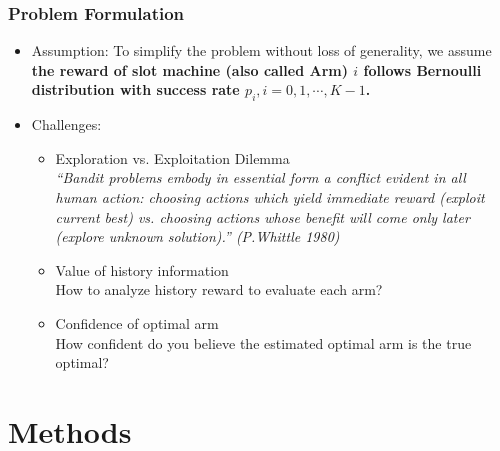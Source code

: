 \documentclass[compress]{beamer}
\begin{document}
\begin{frame}
\frametitle{Problem Formulation}
\begin{itemize}
  \item Assumption: To simplify the problem without loss of generality, we assume \textbf{the reward of slot machine (also called Arm) $i$ follows Bernoulli distribution with success rate $p_{i}, i = 0,1,\cdots,K-1$. }
  \item Challenges:
    \begin{itemize}
      \item Exploration vs. Exploitation Dilemma \\
           \textit{``Bandit problems embody in essential form a conflict evident in all human action: choosing actions which yield immediate reward ({\color{red}exploit current best}) vs. choosing actions whose benefit will come only later ({\color{red}explore unknown solution}).''  (P.Whittle 1980)}
      \item Value of history information \\
            {\color{red}How to analyze history reward to evaluate each arm?}
      \item Confidence of optimal arm \\
            {\color{red}How confident do you believe the estimated optimal arm is the true optimal?}
    \end{itemize}
\end{itemize}
\end{frame}

\section{Methods}

\subsection{}
\end{document}
